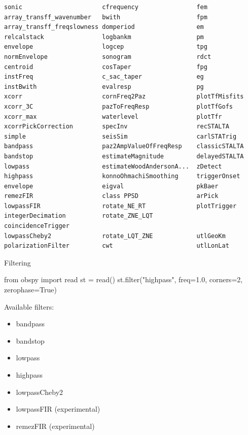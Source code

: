 \documentclass[handout]{beamer}
\begin{document}
\begin{frame}{}

\footnotesize
\begin{verbatim}
sonic                      cfrequency                fem
array_transff_wavenumber   bwith                     fpm
array_transff_freqslowness domperiod                 em
relcalstack                logbankm                  pm
envelope                   logcep                    tpg
normEnvelope               sonogram                  rdct
centroid                   cosTaper                  fpg
instFreq                   c_sac_taper               eg
instBwith                  evalresp                  pg
xcorr                      cornFreq2Paz              plotTfMisfits
xcorr_3C                   pazToFreqResp             plotTfGofs
xcorr_max                  waterlevel                plotTfr
xcorrPickCorrection        specInv                   recSTALTA
simple                     seisSim                   carlSTATrig
bandpass                   paz2AmpValueOfFreqResp    classicSTALTA
bandstop                   estimateMagnitude         delayedSTALTA
lowpass                    estimateWoodAndersonA...  zDetect
highpass                   konnoOhmachiSmoothing     triggerOnset
envelope                   eigval                    pkBaer
remezFIR                   class PPSD                arPick
lowpassFIR                 rotate_NE_RT              plotTrigger
integerDecimation          rotate_ZNE_LQT            coincidenceTrigger
lowpassCheby2              rotate_LQT_ZNE            utlGeoKm
polarizationFilter         cwt                       utlLonLat
\end{verbatim}
\end{frame}

\begin{frame}{Filtering}

\begin{myColorBox}{0.95}{}
\begin{python}
from obspy import read
st = read()
st.filter("highpass", freq=1.0, corners=2, zerophase=True)
\end{python}
\end{myColorBox}

Available filters:
\begin{itemize}
    \item bandpass
    \item bandstop
    \item lowpass
    \item highpass
    \item lowpassCheby2
    \item lowpassFIR (experimental)
    \item remezFIR (experimental)
\end{itemize}



\end{frame}
\end{document}

